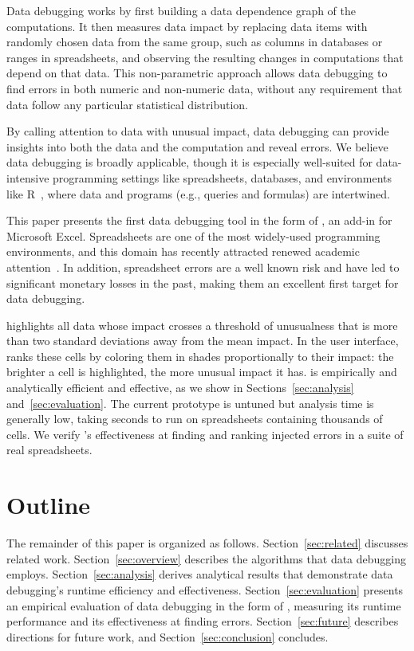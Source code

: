 Data debugging works by first building a data dependence graph of the
computations. It then measures data impact by replacing data items
with randomly chosen data from the same group, such as columns
in databases or ranges in spreadsheets, and observing the resulting
changes in computations that depend on that data. This non-parametric
approach allows data debugging to find errors in both numeric and
non-numeric data, without any requirement that data follow any particular
statistical distribution.

By calling attention to data with unusual impact, data
debugging can provide insights into both the data and the computation
and reveal errors. We believe data debugging is broadly applicable, though it is
especially well-suited for data-intensive programming settings
like spreadsheets, databases, and environments like
R~\cite{ihaka1996r}, where data and programs (e.g., queries and
formulas) are intertwined.

This paper presents the first data debugging tool in the form
of \checkcell{}, an add-in for Microsoft Excel. Spreadsheets are one
of the most widely-used programming environments, and this domain has
recently attracted renewed academic
attention~\cite{DBLP:conf/popl/Gulwani11,DBLP:conf/pldi/HarrisG11,Singh:2012:LSS:2212351.2212356}.
In addition, spreadsheet errors are a well known risk and have led to
significant monetary losses in the past, making them an excellent
first target for data debugging.

\checkcell{} highlights all data whose
impact crosses a threshold of unusualness that is more than two standard deviations away from the mean impact.  In the user interface, \checkcell{} ranks these cells by coloring them in
shades proportionally to their impact: the brighter a cell is
highlighted, the more unusual impact it has.
\checkcell{} is empirically and analytically efficient and effective, as we show in Sections~\ref{sec:analysis} and~\ref{sec:evaluation}. The current prototype is untuned but
analysis time is generally low, taking seconds to run on spreadsheets
containing thousands of cells. We verify \checkcell{}'s effectiveness
at finding and ranking injected errors in a suite of real
spreadsheets.

\section*{Outline}

The remainder of this paper is organized as
follows. Section~\ref{sec:related} discusses related
work. Section~\ref{sec:overview} describes the algorithms that data
debugging employs. Section~\ref{sec:analysis} derives analytical
results that demonstrate data debugging's runtime efficiency and
effectiveness. Section~\ref{sec:evaluation} presents an empirical
evaluation of data debugging in the form of \checkcell{}, measuring
its runtime performance and its effectiveness at finding
errors. Section~\ref{sec:future} describes directions for future work,
and Section~\ref{sec:conclusion} concludes.

